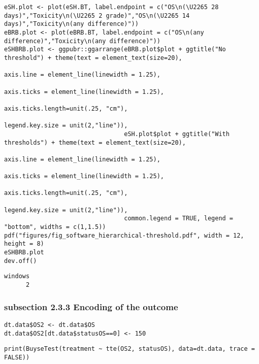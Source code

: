 \documentclass[12pt]{article}
\begin{document}
\lstset{language=r,label= ,caption= ,captionpos=b,numbers=none}
\begin{lstlisting}
eSH.plot <- plot(eSH.BT, label.endpoint = c("OS\n(\U2265 28 days)","Toxicity\n(\U2265 2 grade)","OS\n(\U2265 14 days)","Toxicity\n(any difference)"))
eBRB.plot <- plot(eBRB.BT, label.endpoint = c("OS\n(any difference)","Toxicity\n(any difference)")) 
eSHBRB.plot <- ggpubr::ggarrange(eBRB.plot$plot + ggtitle("No threshold") + theme(text = element_text(size=20), 
                                                                                  axis.line = element_line(linewidth = 1.25),
                                                                                  axis.ticks = element_line(linewidth = 1.25),
                                                                                  axis.ticks.length=unit(.25, "cm"),
                                                                                  legend.key.size = unit(2,"line")),
                                 eSH.plot$plot + ggtitle("With thresholds") + theme(text = element_text(size=20), 
                                                                                    axis.line = element_line(linewidth = 1.25),
                                                                                    axis.ticks = element_line(linewidth = 1.25),
                                                                                    axis.ticks.length=unit(.25, "cm"),
                                                                                    legend.key.size = unit(2,"line")),
                                 common.legend = TRUE, legend = "bottom", widths = c(1,1.5))
pdf("figures/fig_software_hierarchical-threshold.pdf", width = 12, height = 8)
eSHBRB.plot
dev.off()
\end{lstlisting}

\begin{verbatim}
windows 
      2
\end{verbatim}

\subsubsection{subsection 2.3.3 Encoding of the outcome}
\label{sec:orge875731}
\lstset{language=r,label= ,caption= ,captionpos=b,numbers=none}
\begin{lstlisting}
dt.data$OS2 <- dt.data$OS
dt.data$OS2[dt.data$statusOS==0] <- 150
\end{lstlisting}

\lstset{language=r,label= ,caption= ,captionpos=b,numbers=none}
\begin{lstlisting}
print(BuyseTest(treatment ~ tte(OS2, statusOS), data=dt.data, trace = FALSE))
\end{lstlisting}
\end{document}
